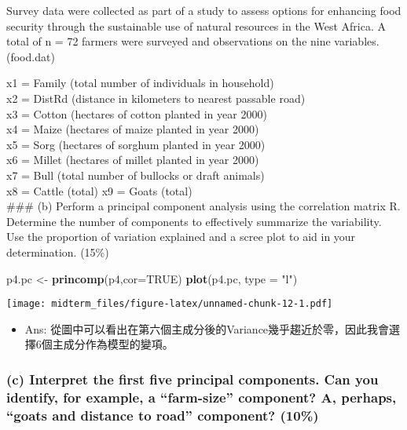 \documentclass[]{article}
\newenvironment{Shaded}{\begin{snugshade}}{\end{snugshade}}
\newcommand{\DataTypeTok}[1]{\textcolor[rgb]{0.13,0.29,0.53}{#1}}
\newcommand{\KeywordTok}[1]{\textcolor[rgb]{0.13,0.29,0.53}{\textbf{#1}}}
\newcommand{\NormalTok}[1]{#1}
\newcommand{\OtherTok}[1]{\textcolor[rgb]{0.56,0.35,0.01}{#1}}
\newcommand{\StringTok}[1]{\textcolor[rgb]{0.31,0.60,0.02}{#1}}
\providecommand{\tightlist}{%
  \setlength{\itemsep}{0pt}\setlength{\parskip}{0pt}}
\begin{document}
Survey data were collected as part of a study to assess options for
enhancing food security through the sustainable use of natural resources
in the West Africa. A total of n = 72 farmers were surveyed and
observations on the nine variables. (food.dat)

x1 = Family (total number of individuals in household)\\
x2 = DistRd (distance in kilometers to nearest passable road)\\
x3 = Cotton (hectares of cotton planted in year 2000)\\
x4 = Maize (hectares of maize planted in year 2000)\\
x5 = Sorg (hectares of sorghum planted in year 2000)\\
x6 = Millet (hectares of millet planted in year 2000)\\
x7 = Bull (total number of bullocks or draft animals)\\
x8 = Cattle (total) x9 = Goats (total)\\
\#\#\# (b) Perform a principal component analysis using the correlation
matrix R. Determine the number of components to effectively summarize
the variability. Use the proportion of variation explained and a scree
plot to aid in your determination. (15\%)

\begin{Shaded}
\begin{Highlighting}[]
\NormalTok{p4.pc <-}\StringTok{ }\KeywordTok{princomp}\NormalTok{(p4,}\DataTypeTok{cor=}\OtherTok{TRUE}\NormalTok{)}
\KeywordTok{plot}\NormalTok{(p4.pc, }\DataTypeTok{type =} \StringTok{"l"}\NormalTok{)}
\end{Highlighting}
\end{Shaded}

\texttt{[image: midterm\_files/figure-latex/unnamed-chunk-12-1.pdf]}

\begin{itemize}
\tightlist
\item
  Ans:
  從圖中可以看出在第六個主成分後的Variance幾乎趨近於零，因此我會選擇6個主成分作為模型的變項。
\end{itemize}

\hypertarget{c-interpret-the-first-five-principal-components.-can-you-identify-for-example-a-farm-size-component-a-perhaps-goats-and-distance-to-road-component-10}{%
\subsubsection{(c) Interpret the first five principal components. Can
you identify, for example, a ``farm-size'' component? A, perhaps,
``goats and distance to road'' component?
(10\%)}\label{c-interpret-the-first-five-principal-components.-can-you-identify-for-example-a-farm-size-component-a-perhaps-goats-and-distance-to-road-component-10}}
\end{document}

